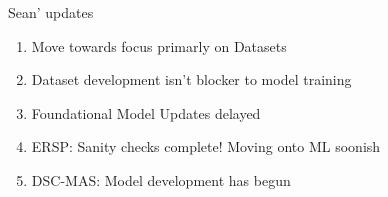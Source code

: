 \begin{frame}{Sean' updates}
    \begin{enumerate}
        \item Move towards focus primarly on Datasets
        \item Dataset development isn't blocker to model training
        \item Foundational Model Updates delayed
        \item ERSP: Sanity checks complete! Moving onto ML soonish
        \item DSC-MAS: Model development has begun
    \end{enumerate}
\end{frame}
